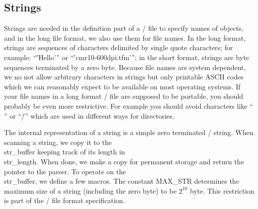 \subsection{Strings}
\label{strings}
Strings are needed in the definition part of a \HINT/
file to specify names of objects, and in the long file format, we also use them for file names.
In the long format, strings are sequences of characters delimited by single quote characters;
for example: ``\.{'Hello'}'' or ``\.{'cmr10-600dpi.tfm'}''; in the short format, strings are
byte sequences terminated by a zero byte.
Because file names are system dependent, we no not allow arbitrary characters in strings
but only printable ASCII codes which we can reasonably expect to be available on most operating systems.
If your file names in a long format \HINT/ file are supposed to be portable,
you should probably be even more restrictive. For example you should avoid characters like
``\.{\\}'' or ``\.{/}'' which are used in different ways for directories.

The internal representation of a string is a simple zero terminated \CEE/ string.
When scanning a string, we copy it to the \\{str\_buffer} keeping track
of its length in \\{str\_length}. When done,
we make a copy for permanent storage and return the pointer to the parser.
To operate on the \\{str\_buffer}, we define a few macros.
The constant \.{MAX\_STR} determines the maximum size of a string (including the zero byte) to be $2^{10}$ byte.
This restriction is part of the \HINT/ file format specification.

